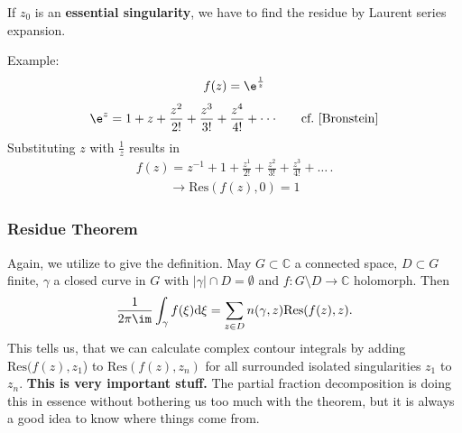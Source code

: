 If $z_0$ is an \textbf{essential singularity}, we have to find the residue by
Laurent series expansion.

\noindent Example:
\begin{align}
	f(z)=\e^{\frac{1}{z}} \nonumber
\end{align}
\begin{align}
	\e^z=1+z+\frac{z^2}{2!}+\frac{z^3}{3!}+\frac{z^4}{4!}+\cdot\cdot\cdot\quad\quad \textrm{cf.~\cite{Bronstein}} \nonumber
\end{align}
Substituting $z$ with $\frac{1}{z}$ results in
\begin{align}
	f(z)=z^{-1}+1+\frac{z^1}{2!}+\frac{z^2}{3!}+\frac{z^3}{4!}+\dots\,. \nonumber
\end{align}
\begin{align}
	\rightarrow\mathrm{Res}(f(z),0)=1 \nonumber
\end{align}
\subsubsection{Residue Theorem}
Again, we utilize \cite{Fritzsche2019} to give the definition.
May $G \subset \mathbb{C}$ a connected space, $D \subset G$ finite, $\gamma$ a closed curve in $G$ with $|\gamma| \cap D = \emptyset$ and $f: G \setminus D \rightarrow \mathbb{C}$ holomorph. Then
\begin{align}
	\frac{1}{2\pi\im}\int_{\gamma}f(\xi)\mathrm{d}\xi = \sum_{z\in D}n(\gamma,z)\mathrm{Res}(f(z),z).
\end{align}
This tells us, that we can calculate complex contour integrals
by adding $\mathrm{Res}(f(z),z_1$) to $\mathrm{Res}(f(z),z_n)$ for all
surrounded isolated singularities $z_1$ to $z_n$. \textbf{This is very important stuff.}
%
The partial fraction decomposition is doing this in essence without bothering
us too much with the theorem, but it is always a good idea to know where things
come from.

